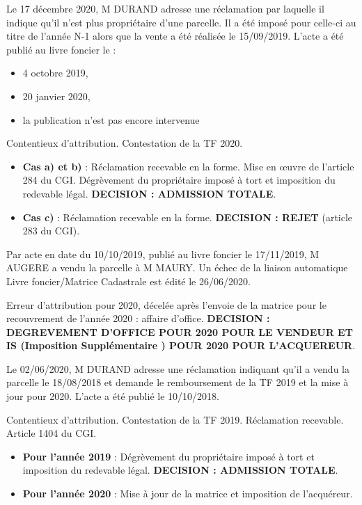 \documentclass[answers, 12pt]{exam}
\begin{document}
	\begin{questions}
		\question Le 17 décembre 2020, M DURAND adresse une réclamation par laquelle il indique qu'il n'est plus propriétaire d'une parcelle. Il a été imposé pour celle-ci au titre de l'année N-1 alors que la vente a été réalisée le 15/09/2019. L'acte a été publié au livre foncier le :
		\begin{itemize}
			\item 4 octobre 2019,
			\item 20 janvier 2020,
			\item la publication n'est pas encore intervenue
		\end{itemize}
		\begin{solution}
			Contentieux d'attribution. Contestation de la TF 2020.
			\begin{itemize}
				\item \textbf{Cas a) et b)} : Réclamation recevable en la forme. Mise en œuvre de l'article 284 du CGI. Dégrèvement du propriétaire imposé à tort et imposition du redevable légal. \textbf{DECISION : ADMISSION TOTALE}.
				\item \textbf{Cas c)} : Réclamation recevable en la forme. \textbf{DECISION : REJET} (article 283 du CGI).
			\end{itemize}
		\end{solution}
		
		\question Par acte en date du 10/10/2019, publié au livre foncier le 17/11/2019, M AUGERE a vendu la parcelle à M MAURY. Un échec de la liaison automatique Livre foncier/Matrice Cadastrale  est édité le 26/06/2020.
		\begin{solution}
			Erreur d'attribution pour 2020, décelée après l'envoie de la matrice pour le recouvrement de l'année 2020 : affaire d'office. 
			\textbf{DECISION : DEGREVEMENT D'OFFICE POUR 2020 POUR LE VENDEUR ET IS (Imposition Supplémentaire ) POUR 2020 POUR L'ACQUEREUR}.
		\end{solution}
		
		\question Le 02/06/2020, M DURAND adresse une réclamation indiquant qu'il a vendu la parcelle le 18/08/2018 et demande le remboursement de la TF 2019 et la mise à jour pour 2020. L'acte a été publié le 10/10/2018.
		\begin{solution}
			Contentieux d'attribution. Contestation de la TF 2019. Réclamation recevable. Article 1404 du CGI.
			\begin{itemize}
				\item \textbf{Pour l'année 2019} : Dégrèvement du propriétaire imposé à tort et imposition du redevable légal. \textbf{DECISION : ADMISSION TOTALE}.
				\item \textbf{Pour l'année 2020} : Mise à jour de la matrice et imposition de l'acquéreur. 
			\end{itemize}
		\end{solution}
	\end{questions}
	
\end{document}
